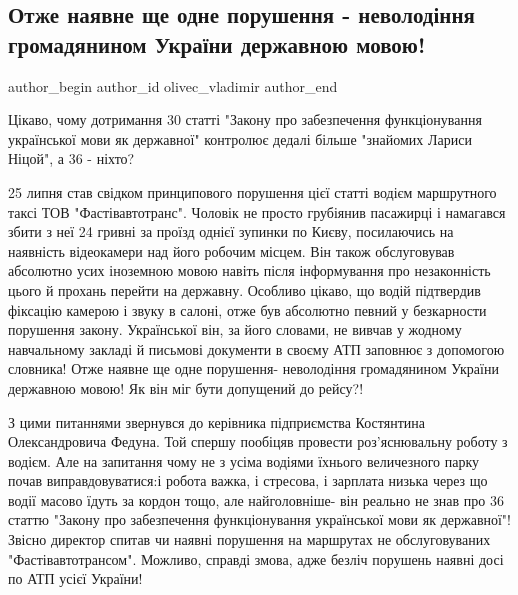  
 
 
 
 
 
\subsection{Отже наявне ще одне порушення - неволодіння громадянином України державною мовою!}
\label{sec:27_07_2021.fb.olivec_vladimir.1.marshrutka_mova}
 
\ifcmt
 author_begin
   author_id olivec_vladimir
 author_end
\fi

Цікаво, чому дотримання 30 статті "Закону про забезпечення функціонування
української мови як державної" контролює дедалі більше "знайомих Лариси Ніцой",
а 36 - ніхто?

25 липня став свідком принципового порушення цієї статті водієм маршрутного
таксі ТОВ "Фастівавтотранс". Чоловік не просто грубіянив пасажирці і намагався
збити з неї 24 гривні за проїзд однієї зупинки по Києву, посилаючись на
наявність відеокамери над його робочим місцем. Він також обслуговував абсолютно
усих іноземною мовою навіть після інформування про незаконність цього й прохань
перейти на державну. Особливо цікаво, що водій підтвердив фіксацію камерою і
звуку в салоні, отже був абсолютно певний у безкарности порушення закону.
Української він, за його словами, не вивчав у жодному навчальному закладі й
письмові документи в своєму АТП заповнює з допомогою словника! Отже наявне ще
одне порушення- неволодіння громадянином України державною мовою! Як він міг
бути допущений до рейсу?!

З цими питаннями звернувся до керівника підприємства Костянтина Олександровича
Федуна. Той спершу пообіцяв провести роз'яснювальну роботу з водієм. Але на
запитання чому не  з усіма водіями їхнього величезного парку почав
виправдовуватися:і робота важка, і стресова, і зарплата низька через що водії
масово їдуть за кордон тощо, але найголовніше- він реально не знав про 36
статтю "Закону про забезпечення функціонування української мови як державної"!
Звісно директор спитав чи наявні порушення на маршрутах не обслуговуваних
"Фастівавтотрансом". Можливо, справді змова, адже безліч порушень наявні досі
по АТП усієї України!

